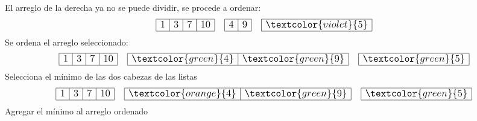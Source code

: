 \documentclass{article}
\begin{document}
\begin{minipage}{0.5\textwidth}
\begin{equation*}
  \end{equation*}
  El arreglo de la derecha ya no se puede dividir, se procede a ordenar:
  \begin{equation*}
    \large
    \begin{array}{|r|r|r|r|}
      \hline 1 & 3 & 7 & 10 \\ \hline
    \end{array}\quad 
    \begin{array}{|r|r|}
      \hline 4 & 9 \\ \hline
    \end{array} \quad
    \begin{array}{|r|}
      \hline \textcolor{violet}{5} \\ \hline
    \end{array}
  \end{equation*}
  Se ordena el arreglo seleccionado:
  \begin{equation*}
    \large
    \begin{array}{|r|r|r|r|}
      \hline 1 & 3 & 7 & 10 \\ \hline
    \end{array}\quad 
    \begin{array}{|r|r|}
      \hline \textcolor{green}{4} & \textcolor{green}{9} \\ \hline
    \end{array} \quad
    \begin{array}{|r|}
      \hline \textcolor{green}{5} \\ \hline
    \end{array}
  \end{equation*}
  Selecciona el mínimo de las dos cabezas de las listas
  \begin{equation*}
    \large
    \begin{array}{|r|r|r|r|}
      \hline 1 & 3 & 7 & 10 \\ \hline
    \end{array}\quad 
    \begin{array}{|r|r|}
      \hline \textcolor{orange}{4} & \textcolor{green}{9} \\ \hline
    \end{array} \quad
    \begin{array}{|r|}
      \hline \textcolor{green}{5} \\ \hline
    \end{array}
  \end{equation*}
  Agregar el mínimo al arreglo ordenado
  \begin{equation*}

\end{equation*}
\end{minipage}
\end{document}
